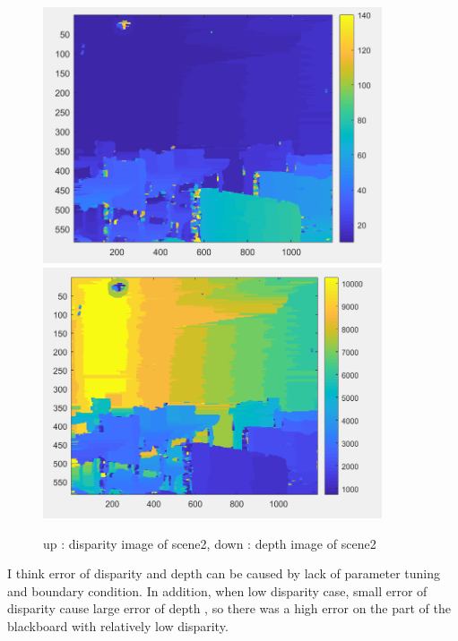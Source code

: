 \begin{figure}[h]
    \centering
    \includegraphics[width=10cm]{result7.png}
    \includegraphics[width=10cm]{result8.png}
    \caption{up : disparity image of scene2, down : depth image of scene2}
    \label{fig:result1}
\end{figure}

I think error of disparity and depth can be caused by lack of parameter tuning and boundary condition. In addition, when low disparity case, small error of disparity cause large error of depth , so there was a high error on the part of the blackboard with relatively low disparity.


